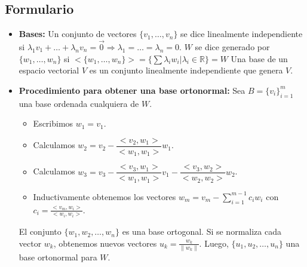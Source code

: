 \documentclass[a4paper]{article}
\theoremstyle{exampstyle}
\theoremstyle{definition}
\begin{document}
\begin{enumerate}
\section*{Formulario} 
\begin{itemize} 
\item \textbf{Bases:} Un conjunto de vectores $\{ v_1, \dots , v_n \}$ se dice linealmente independiente si $ \lambda_1 v_1+ \dots + \lambda_n v_n= \Vec{0} \Longrightarrow \lambda_1= \dots = \lambda_n= 0$. $W$ se dice generado por $\{w_1, \dots , w_n\}$ si $<\{w_1, \dots , w_n\}>=\{ \sum \lambda_iw_i | \lambda_i \in \mathbb{R} \}=W$ Una base de un espacio vectorial $V$ es un conjunto linealmente independiente que genera $V$. \item \textbf{Procedimiento para obtener una base ortonormal:} Sea $B = \{v_i\}_{i=1}^m $ una base ordenada cualquiera de $W $. \begin{itemize} \item Escribimos $w_1 = v_1$. \item Calculamos $w_2=v_2-\dfrac{<v_2,w_1>}{<w_1,w_1>}w_1$. \item Calculamos $w_3=v_3-\dfrac{<v_3,w_1>}{<w_1,w_1>}v_1- \dfrac{<v_3,w_2>}{<w_2,w_2>}w_2$. \item Inductivamente obtenemos los vectores $w_m=v_m-\sum_{i=1}^{m-1}c_iw_i$ con $c_i=\frac{<v_m,w_i>}{<w_i,w_i>}$. \end{itemize} El conjunto $\{ w_1,w_2, \dots, w_n \}$ es una base ortogonal. Si se normaliza cada vector $w_k$, obtenemos nuevos vectores $u_k=\frac{w_k}{\|w_k\|}$. Luego, $\{ u_1,u_2, \dots, u_n \}$ una base ortonormal para $W$. 

\end{itemize}
\end{enumerate}
\end{document}
